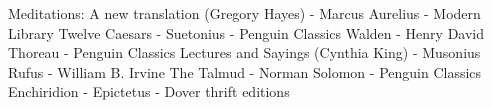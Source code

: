 \begin{thebibliography}{99}

   Meditations: A new translation (Gregory Hayes) - Marcus Aurelius - Modern Library
    Twelve Caesars -  Suetonius - Penguin Classics
     Walden - Henry David Thoreau - Penguin Classics
    Lectures and Sayings (Cynthia King) - Musonius Rufus - William B. Irvine
      The Talmud - Norman Solomon - Penguin Classics
     Enchiridion - Epictetus - Dover thrift editions

\end{thebibliography}
